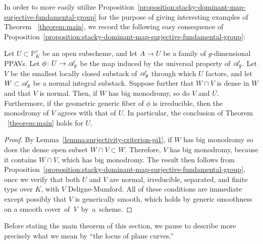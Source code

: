 In order to more easily utilize Proposition~\ref{proposition:stacky-dominant-map-surjective-fundamental-group} for the purpose of giving interesting examples of Theorem ~\ref{theorem:main}, we record the following easy consequence of Proposition~\ref{proposition:stacky-dominant-map-surjective-fundamental-group}:
\vspace*{-0.2cm}
\begin{corollary} \label{corollary:criterion-for-applying-main}
       Let $U \subset \mathbb P^r_K$ be an open subscheme, and let $A \rightarrow U$ be a family of $g$-dimensional PPAVs. Let $\phi \colon U \rightarrow {\mathscr A_g}$ be the map induced by the universal property of ${\mathscr A_g}$.
Let $V$ be the smallest locally closed substack of ${\mathscr A_g}$ through which $U$ factors, and let $W \subset {\mathscr A_g}$ be a normal integral substack.
Suppose further that $W \cap V$ is dense in $W$ and that $V$ is normal.
Then, if $W$ has big monodromy, so do $V$ and $U$.
Furthermore, if the geometric generic fiber of $\phi$ is irreducible, then the monodromy of $V$ agrees with that of $U$. In particular, the conclusion of Theorem ~\ref{theorem:main}
holds for $U$.
\end{corollary}
\vspace*{-0.4cm}
\begin{proof}
	By Lemma~\ref{lemma:surjectivity-criterion-pi1}, if $W$ has big monodromy so does the dense open subset $W \cap V \subset W$.
	Therefore, $V$ has big monodromy, because it contains $W \cap V$, which has big monodromy.
	The result then follows from Proposition~\ref{proposition:stacky-dominant-map-surjective-fundamental-group},
once we verify that both $U$ and $V$ are normal, irreducible, separated, and finite type over $K$, with $V$ Deligne-Mumford.
All of these conditions are immediate except possibly that $V$
is generically smooth, which holds by generic smoothness on a smooth \mbox{cover of $V$ by a scheme.}
\end{proof}
\vspace*{-0.2cm}
Before stating the main theorem of this section, we pause to describe more precisely what we mean
by ``the locus of plane curves.''
